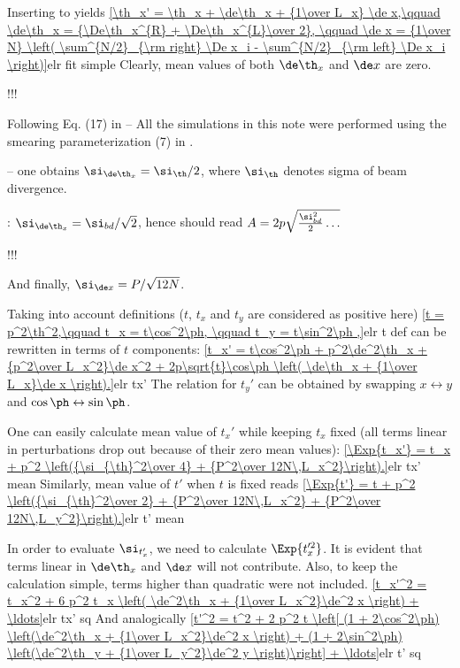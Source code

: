 Inserting  to  yields
\eqref{\th_x' = \th_x + \de\th_x + {1\over L_x} \de x,\qquad \de\th_x = {\De\th_x^{R} + \De\th_x^{L}\over 2}, \qquad \de x = {1\over N} \left( \sum^{N/2}_{\rm right} \De x_i - \sum^{N/2}_{\rm left} \De x_i \right)}{elr fit simple}
Clearly, mean values of both $\de\th_x$ and $\de x$ are zero. 

!!!

Following Eq. (17) in  --
All the simulations in this note were performed using the smearing parameterization (7) in . 

-- one obtains $\si_{\de\th_x} = \si_\th / 2$, where $\si_\th$ denotes sigma of beam divergence.

: $\si_{\de\th_x} = \si_{bd} / \sqrt{2}$, hence  should read $A = 2p \sqrt{{\si^2_{bd}\over 2} \ldots}$

!!!


And finally, $\si_{\de x} = P / \sqrt{12N}$.

Taking into account definitions ($t$, $t_x$ and $t_y$ are considered as positive here)
\eqref{t = p^2\th^2,\qquad t_x = t\cos^2\ph, \qquad t_y = t\sin^2\ph ,}{elr t def}
 can be rewritten in terms of $t$ components:
\eqref{t_x' = t\cos^2\ph + p^2\de^2\th_x + {p^2\over L_x^2}\de x^2 + 2p\sqrt{t}\cos\ph \left( \de\th_x + {1\over L_x}\de x \right).}{elr tx'}
The relation for $t_y'$ can be obtained by swapping $x\leftrightarrow y$ and $\cos\ph\leftrightarrow\sin\ph$. 

One can easily calculate mean value of $t_x'$ while keeping $t_x$ fixed (all terms linear in perturbations drop out because of their zero mean values):
\eqref{\Exp{t_x'} = t_x + p^2 \left({\si_{\th}^2\over 4} + {P^2\over 12N\,L_x^2}\right).}{elr tx' mean}
Similarly, mean value of $t'$ when $t$ is fixed reads
\eqref{\Exp{t'} = t + p^2 \left({\si_{\th}^2\over 2} + {P^2\over 12N\,L_x^2} + {P^2\over 12N\,L_y^2}\right).}{elr t' mean}

In order to evaluate $\si_{t_x'}$, we need to calculate $\Exp{t_x'^2}$. It is evident that terms linear in $\de\th_x$ and $\de x$ will not contribute. Also, to keep the calculation simple, terms higher than quadratic were not included. 
\eqref{t_x'^2 = t_x^2 + 6 p^2 t_x \left( \de^2\th_x + {1\over L_x^2}\de^2 x \right) + \ldots}{elr tx' sq}
And analogically
\eqref{t'^2 = t^2 + 2 p^2 t \left[ (1 + 2\cos^2\ph) \left(\de^2\th_x + {1\over L_x^2}\de^2 x \right) + (1 + 2\sin^2\ph) \left(\de^2\th_y + {1\over L_y^2}\de^2 y \right)\right] + \ldots}{elr t' sq}

